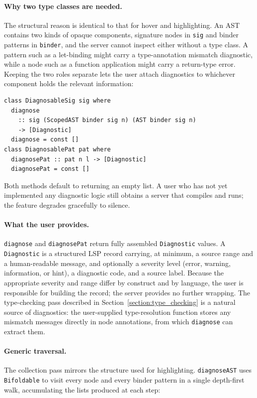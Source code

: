 \paragraph{Why two type classes are needed.}
The structural reason is identical to that for hover and highlighting.
An AST contains two kinds of opaque components, signature nodes in \texttt{sig} and binder patterns in \texttt{binder}, and the server cannot inspect either without a type class.
A pattern such as a let-binding might carry a type-annotation mismatch diagnostic, while a node such as a function application might carry a return-type error.
Keeping the two roles separate lets the user attach diagnostics to whichever component holds the relevant information:

\begin{verbatim}
class DiagnosableSig sig where
  diagnose
    :: sig (ScopedAST binder sig n) (AST binder sig n)
    -> [Diagnostic]
  diagnose = const []
class DiagnosablePat pat where
  diagnosePat :: pat n l -> [Diagnostic]
  diagnosePat = const []
\end{verbatim}

Both methods default to returning an empty list.
A user who has not yet implemented any diagnostic logic still obtains a server that compiles and runs; the feature degrades gracefully to silence.

\paragraph{What the user provides.}
\texttt{diagnose} and \texttt{diagnosePat} return fully assembled \texttt{Diagnostic} values.
A \texttt{Diagnostic} is a structured LSP record carrying, at minimum, a source range and a human-readable message, and optionally a severity level (error, warning, information, or hint), a diagnostic code, and a source label.
Because the appropriate severity and range differ by construct and by language, the user is responsible for building the record; the server provides no further wrapping.
The type-checking pass described in Section~\ref{section:type_checking} is a natural source of diagnostics: the user-supplied type-resolution function stores any mismatch messages directly in node annotations, from which \texttt{diagnose} can extract them.

\paragraph{Generic traversal.}
The collection pass mirrors the structure used for highlighting.
\texttt{diagnoseAST} uses \texttt{Bifoldable} to visit every node and every binder pattern in a single depth-first walk, accumulating the lists produced at each step:

